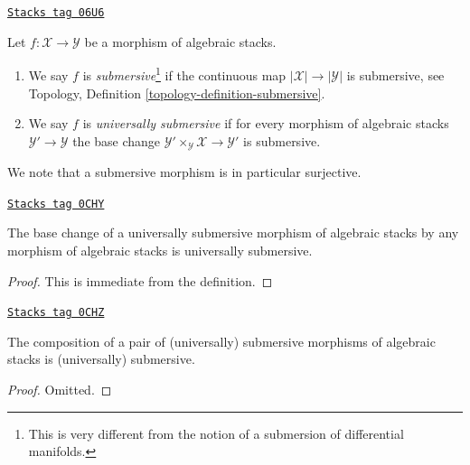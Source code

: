 \begin{definition}[Submersive]
\label{stacks-morphisms-definition-submersive}
\href{https://stacks.math.columbia.edu/tag/06U6}{\texttt{Stacks tag 06U6}}

Let $f : \mathcal{X} \to \mathcal{Y}$ be a morphism of algebraic stacks.
\begin{enumerate}
\item We say $f$ is {\it submersive}\footnote{This is very different
from the notion of a submersion of differential manifolds.}
if the continuous map $|\mathcal{X}| \to |\mathcal{Y}|$ is submersive, see
Topology, Definition \ref{topology-definition-submersive}.
\item We say $f$ is {\it universally submersive} if for every
morphism of algebraic stacks $\mathcal{Y}' \to \mathcal{Y}$
the base change $\mathcal{Y}' \times_\mathcal{Y} \mathcal{X} \to \mathcal{Y}'$
is submersive.
\end{enumerate}
\end{definition}

We note that a submersive morphism is in particular surjective.

\begin{lemma}
\label{stacks-morphisms-lemma-base-change-universally-submersive}
\href{https://stacks.math.columbia.edu/tag/0CHY}{\texttt{Stacks tag 0CHY}}

The base change of a universally submersive morphism of algebraic stacks
by any morphism of algebraic stacks is universally submersive.
\end{lemma}

\begin{proof}
This is immediate from the definition.
\end{proof}

\begin{lemma}
\label{stacks-morphisms-lemma-composition-universally-submersive}
\href{https://stacks.math.columbia.edu/tag/0CHZ}{\texttt{Stacks tag 0CHZ}}

The composition of a pair of (universally) submersive morphisms of
algebraic stacks is (universally) submersive.
\end{lemma}

\begin{proof}
Omitted.
\end{proof}

